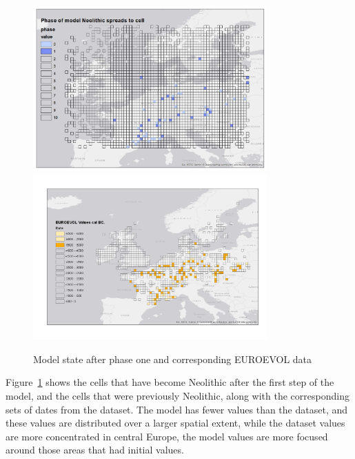 \begin{figure}
\centering
	\includegraphics[width=0.8\textwidth]{figures/model-1}
	\includegraphics[width=0.8\textwidth]{figures/euroevol-1}
  \caption{Model state after phase one and corresponding EUROEVOL data}
  \label{fig:compare1}
\end{figure}

Figure~\ref{fig:compare1} shows the cells that have become Neolithic after the first step of the model, and the cells that were previously Neolithic, along with the corresponding sets of dates from the dataset. The model has fewer values than the dataset, and these values are distributed over a larger spatial extent, while the dataset values are more concentrated in central Europe, the model values are more focused around those areas that had initial values.

